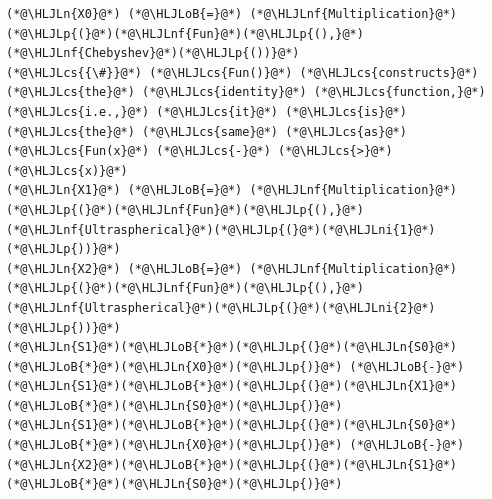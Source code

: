 \documentclass[12pt,a4paper]{article}
\newcommand{\HLJLn}[1]{#1}
\newcommand{\HLJLnf}[1]{\textcolor[RGB]{66,102,213}{#1}}
\newcommand{\HLJLni}[1]{\textcolor[RGB]{59,151,46}{#1}}
\newcommand{\HLJLoB}[1]{\textcolor[RGB]{102,102,102}{\textbf{#1}}}
\newcommand{\HLJLp}[1]{#1}
\newcommand{\HLJLcs}[1]{\textcolor[RGB]{153,153,119}{\textit{#1}}}
\begin{document}
\begin{lstlisting}
(*@\HLJLn{X0}@*) (*@\HLJLoB{=}@*) (*@\HLJLnf{Multiplication}@*)(*@\HLJLp{(}@*)(*@\HLJLnf{Fun}@*)(*@\HLJLp{(),}@*)(*@\HLJLnf{Chebyshev}@*)(*@\HLJLp{())}@*)  
(*@\HLJLcs{{\#}}@*) (*@\HLJLcs{Fun()}@*) (*@\HLJLcs{constructs}@*) (*@\HLJLcs{the}@*) (*@\HLJLcs{identity}@*) (*@\HLJLcs{function,}@*) (*@\HLJLcs{i.e.,}@*) (*@\HLJLcs{it}@*) (*@\HLJLcs{is}@*) (*@\HLJLcs{the}@*) (*@\HLJLcs{same}@*) (*@\HLJLcs{as}@*) (*@\HLJLcs{Fun(x}@*) (*@\HLJLcs{-}@*) (*@\HLJLcs{>}@*) (*@\HLJLcs{x)}@*)
(*@\HLJLn{X1}@*) (*@\HLJLoB{=}@*) (*@\HLJLnf{Multiplication}@*)(*@\HLJLp{(}@*)(*@\HLJLnf{Fun}@*)(*@\HLJLp{(),}@*)(*@\HLJLnf{Ultraspherical}@*)(*@\HLJLp{(}@*)(*@\HLJLni{1}@*)(*@\HLJLp{))}@*)
(*@\HLJLn{X2}@*) (*@\HLJLoB{=}@*) (*@\HLJLnf{Multiplication}@*)(*@\HLJLp{(}@*)(*@\HLJLnf{Fun}@*)(*@\HLJLp{(),}@*)(*@\HLJLnf{Ultraspherical}@*)(*@\HLJLp{(}@*)(*@\HLJLni{2}@*)(*@\HLJLp{))}@*)
(*@\HLJLn{S1}@*)(*@\HLJLoB{*}@*)(*@\HLJLp{(}@*)(*@\HLJLn{S0}@*)(*@\HLJLoB{*}@*)(*@\HLJLn{X0}@*)(*@\HLJLp{)}@*) (*@\HLJLoB{-}@*) (*@\HLJLn{S1}@*)(*@\HLJLoB{*}@*)(*@\HLJLp{(}@*)(*@\HLJLn{X1}@*)(*@\HLJLoB{*}@*)(*@\HLJLn{S0}@*)(*@\HLJLp{)}@*)
(*@\HLJLn{S1}@*)(*@\HLJLoB{*}@*)(*@\HLJLp{(}@*)(*@\HLJLn{S0}@*)(*@\HLJLoB{*}@*)(*@\HLJLn{X0}@*)(*@\HLJLp{)}@*) (*@\HLJLoB{-}@*) (*@\HLJLn{X2}@*)(*@\HLJLoB{*}@*)(*@\HLJLp{(}@*)(*@\HLJLn{S1}@*)(*@\HLJLoB{*}@*)(*@\HLJLn{S0}@*)(*@\HLJLp{)}@*)
\end{lstlisting}
\end{document}
